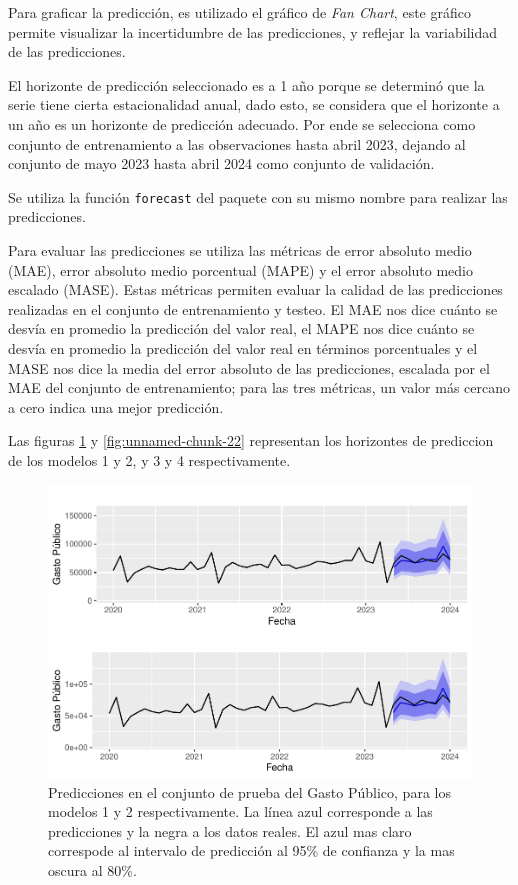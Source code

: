 \documentclass[
  12pt,
]{article}
\begin{document}
Para graficar la predicción, es utilizado el gráfico de \emph{Fan
Chart}, este gráfico permite visualizar la incertidumbre de las
predicciones, y reflejar la variabilidad de las predicciones.

El horizonte de predicción seleccionado es a 1 año porque se determinó
que la serie tiene cierta estacionalidad anual, dado esto, se considera
que el horizonte a un año es un horizonte de predicción adecuado. Por
ende se selecciona como conjunto de entrenamiento a las observaciones
hasta abril 2023, dejando al conjunto de mayo 2023 hasta abril 2024 como
conjunto de validación.

Se utiliza la función \texttt{forecast} del paquete con su mismo nombre
para realizar las predicciones.

Para evaluar las predicciones se utiliza las métricas de error absoluto
medio (MAE), error absoluto medio porcentual (MAPE) y el error absoluto
medio escalado (MASE). Estas métricas permiten evaluar la calidad de las
predicciones realizadas en el conjunto de entrenamiento y testeo. El MAE
nos dice cuánto se desvía en promedio la predicción del valor real, el
MAPE nos dice cuánto se desvía en promedio la predicción del valor real
en términos porcentuales y el MASE nos dice la media del error absoluto
de las predicciones, escalada por el MAE del conjunto de entrenamiento;
para las tres métricas, un valor más cercano a cero indica una mejor
predicción.

Las figuras \ref{fig:unnamed-chunk-21} y \ref{fig:unnamed-chunk-22} representan los horizontes de prediccion de los modelos 1 y 2, y 3 y 4 respectivamente.

\begin{figure}[H]

{\centering \includegraphics[width=0.95\linewidth]{informe_files/figure-latex/unnamed-chunk-21-1}

}

\caption{\label{fig:unnamed-chunk-21} Predicciones en el conjunto de prueba del Gasto
Público, para los modelos 1 y 2 respectivamente. La línea azul
corresponde a las predicciones y la negra a los datos reales. El azul
mas claro correspode al intervalo de predicción al 95\% de confianza y
la mas oscura al 80\%.}

\end{figure}
\end{document}
